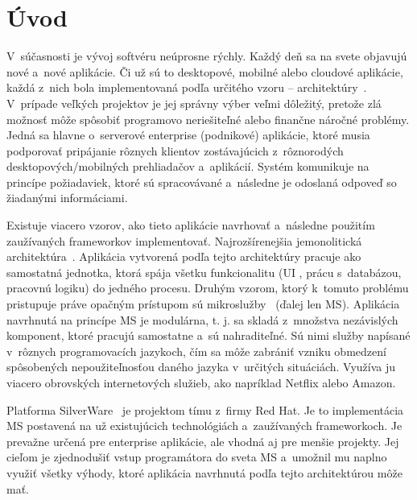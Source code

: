\documentclass[a4paper]{article}
\begin{document}
\section*{Úvod}
V~súčasnosti je vývoj softvéru neúprosne rýchly. Každý deň sa na svete objavujú nové a~nové aplikácie. Či už sú to desktopové, mobilné alebo cloudové  aplikácie, každá z~nich bola implementovaná podľa určitého vzoru – architektúry~\cite{enterprise}. V~prípade veľkých projektov je jej správny výber veľmi dôležitý, pretože zlá možnosť môže spôsobiť programovo neriešiteľné alebo finančne náročné problémy. Jedná sa hlavne o~serverové enterprise (podnikové) aplikácie, ktoré musia podporovať pripájanie rôznych klientov zostávajúcich z~rôznorodých desktopových/mobilných prehliadačov a~aplikácií. Systém komunikuje na princípe požiadaviek, ktoré sú spracovávané a~následne je odoslaná odpoveď so žiadanými informáciami.

Existuje viacero vzorov, ako tieto aplikácie navrhovať a~následne použitím zaužívaných frameworkov  implementovať. Najrozšírenejšia jemonolitická architektúra~\cite{monolithic}. Aplikácia vytvorená podľa tejto architektúry pracuje ako samostatná jednotka, ktorá spája všetku funkcionalitu (UI , prácu s~databázou, pracovnú logiku) do jedného procesu. Druhým vzorom, ktorý k~tomuto problému pristupuje práve opačným prístupom sú mikroslužby~\cite{micro} (ďalej len MS). Aplikácia navrhnutá na princípe MS je modulárna, t. j. sa skladá z~množstva nezávislých komponent, ktoré pracujú samostatne a~sú nahraditeľné. Sú nimi služby napísané v~rôznych programovacích jazykoch, čím sa môže zabrániť vzniku obmedzení spôsobených nepoužiteľnosťou daného jazyka v~určitých situáciách. Využíva ju viacero obrovských internetových služieb, ako napríklad Netflix alebo Amazon.

Platforma SilverWare~\cite{silver} je projektom tímu z~firmy Red Hat. Je to implementácia MS postavená na už existujúcich technológiách a~zaužívaných frameworkoch. Je prevažne určená pre enterprise aplikácie, ale vhodná aj pre menšie projekty. Jej cieľom je zjednodušiť vstup programátora do sveta  MS a~umožnil mu naplno využiť všetky výhody, ktoré aplikácia navrhnutá podľa tejto architektúrou môže mať.
\end{document}
